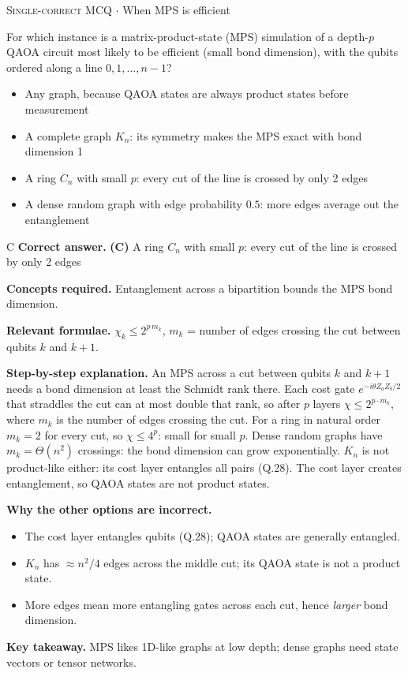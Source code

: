 \documentclass[11pt,a4paper]{article}
\newcommand{\optlabel}[1]{\textbf{(#1)}}
\newcommand{\correctlabel}[1]{\textcolor{okgreen}{\textbf{(#1)}\,\ding{51}}}
\newenvironment{qitem}[1]{\begin{list}{}{\setlength{\leftmargin}{3.3em}\setlength{\labelwidth}{3.1em}%
  \setlength{\labelsep}{0.2em}\setlength{\topsep}{3pt}\setlength{\parsep}{3pt}}\item[\textbf{Q.#1}\hfill]}{\end{list}}
\newcommand{\qsep}{\par\vspace{2pt}{\color{black!15}\hrule}\vspace{4pt}}
\newcommand{\qmeta}[2]{{\footnotesize\color{black!60}\textsc{#1} \;$\cdot$\; #2}\par}
\begin{document}
\begin{qitem}{69}
\qmeta{Single-correct MCQ}{When MPS is efficient}
For which instance is a matrix-product-state (MPS) simulation of a depth-$p$ QAOA circuit most likely to be efficient (small
bond dimension), with the qubits ordered along a line $0, 1, \dots, n-1$?
\begin{itemize}[leftmargin=2.6em, labelsep=0.4em, itemsep=2pt, topsep=3pt]
\item[\optlabel{A}] Any graph, because QAOA states are always product states before measurement
\item[\optlabel{B}] A complete graph $K_n$: its symmetry makes the MPS exact with bond dimension 1
\item[\correctlabel{C}] A ring $C_n$ with small $p$: every cut of the line is crossed by only 2 edges
\item[\optlabel{D}] A dense random graph with edge probability $0.5$: more edges average out the entanglement
\end{itemize}
\end{qitem}
\begin{solbox}{C}
\textbf{\color{brand}Correct answer.} \textcolor{okgreen}{\textbf{(C)}} A ring $C_n$ with small $p$: every cut of the line is crossed by only 2 edges

\textbf{\color{brand}Concepts required.} Entanglement across a bipartition bounds the MPS bond dimension.

\textbf{\color{brand}Relevant formulae.} $\chi_k \le 2^{p\,m_k}$, $m_k$ = number of edges crossing the cut between qubits $k$ and $k+1$.

\textbf{\color{brand}Step-by-step explanation.} An MPS across a cut between qubits $k$ and $k+1$ needs a bond dimension at least the Schmidt rank there. Each cost gate
$e^{-i\theta Z_aZ_b/2}$ that straddles the cut can at most double that rank, so after $p$ layers $\chi \le 2^{p\cdot m_k}$, where $m_k$ is the
number of edges crossing the cut. For a ring in natural order $m_k = 2$ for every cut, so $\chi \le 4^p$: small for small $p$.
Dense random graphs have $m_k = \Theta(n^2)$ crossings: the bond dimension can grow exponentially. $K_n$ is not product-like
either: its cost layer entangles all pairs (Q.28). The cost layer creates entanglement, so QAOA states are not product states.

\textbf{\color{brand}Why the other options are incorrect.}
\begin{itemize}[leftmargin=2.4em, itemsep=1pt, topsep=2pt]
\item[\textbf{(A)}] The cost layer entangles qubits (Q.28); QAOA states are generally entangled.
\item[\textbf{(B)}] $K_n$ has $\approx n^2/4$ edges across the middle cut; its QAOA state is not a product state.
\item[\textbf{(D)}] More edges mean more entangling gates across each cut, hence \emph{larger} bond dimension.
\end{itemize}
\textbf{\color{brand}Key takeaway.} MPS likes 1D-like graphs at low depth; dense graphs need state vectors or tensor networks.
\end{solbox}
\qsep
\end{document}
